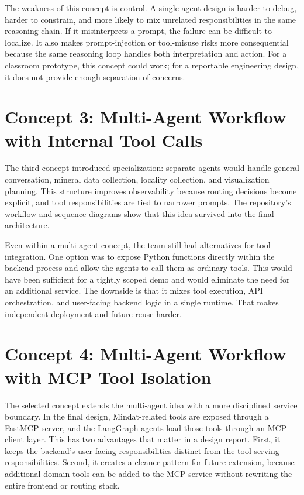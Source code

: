\documentclass[12pt,oneside]{report}
\begin{document}
The weakness of this concept is control. A single-agent design is harder to debug, harder to constrain, and more likely to mix unrelated responsibilities in the same reasoning chain. If it misinterprets a prompt, the failure can be difficult to localize. It also makes prompt-injection or tool-misuse risks more consequential because the same reasoning loop handles both interpretation and action. For a classroom prototype, this concept could work; for a reportable engineering design, it does not provide enough separation of concerns.

\section{Concept 3: Multi-Agent Workflow with Internal Tool Calls}

The third concept introduced specialization: separate agents would handle general conversation, mineral data collection, locality collection, and visualization planning. This structure improves observability because routing decisions become explicit, and tool responsibilities are tied to narrower prompts. The repository's workflow and sequence diagrams show that this idea survived into the final architecture.

Even within a multi-agent concept, the team still had alternatives for tool integration. One option was to expose Python functions directly within the backend process and allow the agents to call them as ordinary tools. This would have been sufficient for a tightly scoped demo and would eliminate the need for an additional service. The downside is that it mixes tool execution, API orchestration, and user-facing backend logic in a single runtime. That makes independent deployment and future reuse harder.

\section{Concept 4: Multi-Agent Workflow with MCP Tool Isolation}

The selected concept extends the multi-agent idea with a more disciplined service boundary. In the final design, Mindat-related tools are exposed through a FastMCP server, and the LangGraph agents load those tools through an MCP client layer. This has two advantages that matter in a design report. First, it keeps the backend's user-facing responsibilities distinct from the tool-serving responsibilities. Second, it creates a cleaner pattern for future extension, because additional domain tools can be added to the MCP service without rewriting the entire frontend or routing stack.
\end{document}
